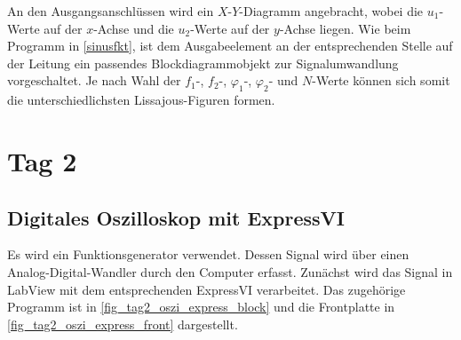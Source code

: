 \documentclass[
a4paper,
12pt,
pagesize,
ngerman
]{scrartcl}
\begin{document}
	\noindent An den Ausgangsanschlüssen wird ein $X$-$Y$-Diagramm angebracht, wobei die $u_1$-Werte auf der $x$-Achse und die $u_2$-Werte auf der $y$-Achse liegen. Wie beim Programm in \cref{sinusfkt}, ist dem Ausgabeelement an der entsprechenden Stelle auf der Leitung ein passendes Blockdiagrammobjekt zur Signalumwandlung vorgeschaltet. Je nach Wahl der $f_1$-, $f_2$-, $\varphi_1$-, $\varphi_2$- und $N$-Werte können sich somit die unterschiedlichsten Lissajous-Figuren formen.
	
	\section{Tag 2}
	
	\subsection{Digitales Oszilloskop mit ExpressVI}
	Es wird ein Funktionsgenerator verwendet.
	Dessen Signal wird über einen Analog-Digital-Wandler durch den Computer erfasst.
	Zunächst wird das Signal in LabView mit dem entsprechenden ExpressVI verarbeitet.
	Das zugehörige Programm ist in \cref{fig_tag2_oszi_express_block} und die Frontplatte in \cref{fig_tag2_oszi_express_front} dargestellt.
	
\end{document}
